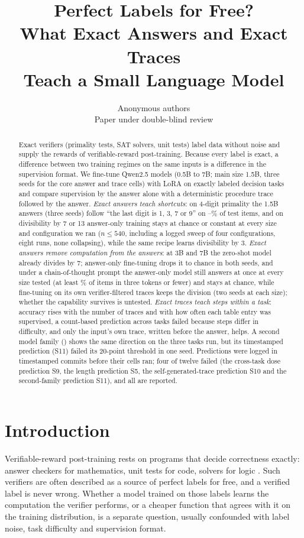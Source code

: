 \documentclass{article}
\title{Perfect Labels for Free?\\ What Exact Answers and Exact Traces\\ Teach a Small Language Model}
\author{Anonymous authors\\ Paper under double-blind review}
\theoremstyle{definition}
\begin{document}
\maketitle

\begin{abstract}
Exact verifiers (primality tests, SAT solvers, unit tests) label data without noise and supply the rewards of verifiable-reward post-training. Because every label is exact, a difference between two training regimes on the same inputs is a difference in the supervision format. We fine-tune Qwen2.5 models (0.5B to 7B; main size 1.5B, three seeds for the core answer and trace cells) with LoRA on exactly labeled decision tasks and compare supervision by the answer alone with a deterministic procedure trace followed by the answer. \emph{Exact answers teach shortcuts}: on 4-digit primality the 1.5B answers (three seeds) follow ``the last digit is 1, 3, 7 or 9'' on \primeAagreeLastDigitLo--\primeAagreeLastDigitHi\% of test items, and on divisibility by 7 or 13 answer-only training stays at chance or constant at every size and configuration we ran ($n\le540$, including a logged sweep of four configurations, eight runs, none collapsing), while the same recipe learns divisibility by 3. \emph{Exact answers remove computation from the answers}: at 3B and 7B the zero-shot model already divides by 7; answer-only fine-tuning drops it to chance in both seeds, and under a chain-of-thought prompt the answer-only model still answers at once at every size tested (at least \bigAcotShortMin\% of items in three tokens or fewer) and stays at chance, while fine-tuning on its own verifier-filtered traces keeps the division (two seeds at each size); whether the capability survives is untested. \emph{Exact traces teach steps within a task}: accuracy rises with the number of traces and with how often each table entry was supervised, a count-based prediction across tasks failed because steps differ in difficulty, and only the input's own trace, written before the answer, helps. A second model family (\secondFamilyModel) shows the same direction on the three tasks run, but its timestamped prediction (S11) failed its 20-point threshold in one seed. Predictions were logged in timestamped commits before their cells ran; four of twelve failed (the cross-task dose prediction S9, the length prediction S5, the self-generated-trace prediction S10 and the second-family prediction S11), and all are reported.
\end{abstract}

\section{Introduction}
Verifiable-reward post-training rests on programs that decide correctness exactly: answer checkers for mathematics, unit tests for code, solvers for logic \citep{lambert2024tulu,deepseek2025r1}. Such verifiers are often described as a source of perfect labels for free, and a verified label is never wrong. Whether a model trained on those labels learns the computation the verifier performs, or a cheaper function that agrees with it on the training distribution, is a separate question, usually confounded with label noise, task difficulty and supervision format.
\end{document}
